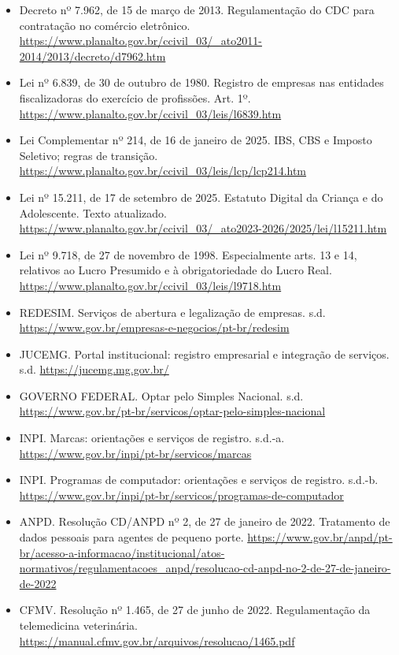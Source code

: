 \begin{itemize}[leftmargin=1.2em,itemsep=6pt]
\item Decreto nº 7.962, de 15 de março de 2013. Regulamentação do CDC para contratação no comércio eletrônico. \url{https://www.planalto.gov.br/ccivil_03/_ato2011-2014/2013/decreto/d7962.htm}
\item Lei nº 6.839, de 30 de outubro de 1980. Registro de empresas nas entidades fiscalizadoras do exercício de profissões. Art. 1º. \url{https://www.planalto.gov.br/ccivil_03/leis/l6839.htm}
\item Lei Complementar nº 214, de 16 de janeiro de 2025. IBS, CBS e Imposto Seletivo; regras de transição. \url{https://www.planalto.gov.br/ccivil_03/leis/lcp/lcp214.htm}
\item Lei nº 15.211, de 17 de setembro de 2025. Estatuto Digital da Criança e do Adolescente. Texto atualizado. \url{https://www.planalto.gov.br/ccivil_03/_ato2023-2026/2025/lei/l15211.htm}
\item Lei nº 9.718, de 27 de novembro de 1998. Especialmente arts. 13 e 14, relativos ao Lucro Presumido e à obrigatoriedade do Lucro Real. \url{https://www.planalto.gov.br/ccivil_03/leis/l9718.htm}
\item REDESIM. Serviços de abertura e legalização de empresas. s.d. \url{https://www.gov.br/empresas-e-negocios/pt-br/redesim}
\item JUCEMG. Portal institucional: registro empresarial e integração de serviços. s.d. \url{https://jucemg.mg.gov.br/}
\item GOVERNO FEDERAL. Optar pelo Simples Nacional. s.d. \url{https://www.gov.br/pt-br/servicos/optar-pelo-simples-nacional}
\item INPI. Marcas: orientações e serviços de registro. s.d.-a. \url{https://www.gov.br/inpi/pt-br/servicos/marcas}
\item INPI. Programas de computador: orientações e serviços de registro. s.d.-b. \url{https://www.gov.br/inpi/pt-br/servicos/programas-de-computador}
\item ANPD. Resolução CD/ANPD nº 2, de 27 de janeiro de 2022. Tratamento de dados pessoais para agentes de pequeno porte. \url{https://www.gov.br/anpd/pt-br/acesso-a-informacao/institucional/atos-normativos/regulamentacoes_anpd/resolucao-cd-anpd-no-2-de-27-de-janeiro-de-2022}
\item CFMV. Resolução nº 1.465, de 27 de junho de 2022. Regulamentação da telemedicina veterinária. \url{https://manual.cfmv.gov.br/arquivos/resolucao/1465.pdf}
\end{itemize}